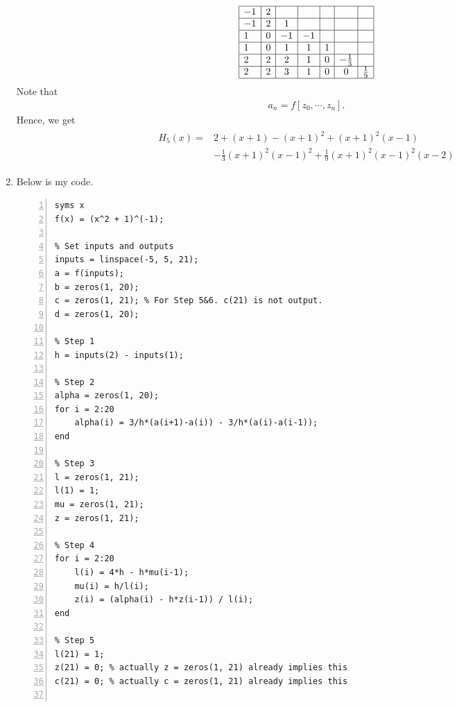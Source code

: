 \documentclass{article}
\begin{document}
\begin{enumerate}
\begin{align}
        \begin{array}{|l|c|c|c|c|c|c|}
            \hline
            -1 & 2 &    &&&&
            \\
            \hline
            -1 & 2 & 1  &&&&
            \\
            \hline
            1 & 0 & -1  & -1    &&&
            \\
            \hline
            1 & 0 & 1   & 1     & 1 &&
            \\
            \hline
            2 & 2 & 2   & 1     & 0 & -\frac{1}{3}  &
            \\
            \hline
            2 & 2 & 3   & 1     & 0 & 0             & \frac{1}{9}
            \\
            \hline
        \end{array}
    \end{align}
    Note that
    \begin{align*}
         a_n = f[z_0, \cdots, z_n].
    \end{align*}
    Hence, we get
    \begin{align}
        \begin{split}
            H_5(x) = & 2 + (x+1) - (x+1)^2 + (x+1)^2(x-1)
            \\ & - \frac{1}{3}(x+1)^2(x-1)^2 + \frac{1}{9}(x+1)^2(x-1)^2(x-2)
        \end{split}
    \end{align}
    \item Below is my code. \begin{lstlisting}[frame=single, numbers=left, style=Matlab-editor]
% Set our function
syms x
f(x) = (x^2 + 1)^(-1);

% Set inputs and outputs
inputs = linspace(-5, 5, 21);
a = f(inputs);
b = zeros(1, 20);
c = zeros(1, 21); % For Step 5&6. c(21) is not output.
d = zeros(1, 20);

% Step 1
h = inputs(2) - inputs(1);

% Step 2
alpha = zeros(1, 20);
for i = 2:20
    alpha(i) = 3/h*(a(i+1)-a(i)) - 3/h*(a(i)-a(i-1));
end

% Step 3
l = zeros(1, 21);
l(1) = 1;
mu = zeros(1, 21);
z = zeros(1, 21);

% Step 4
for i = 2:20
    l(i) = 4*h - h*mu(i-1);
    mu(i) = h/l(i);
    z(i) = (alpha(i) - h*z(i-1)) / l(i);
end

% Step 5
l(21) = 1;
z(21) = 0; % actually z = zeros(1, 21) already implies this
c(21) = 0; % actually c = zeros(1, 21) already implies this


\end{lstlisting}
\end{enumerate}
\end{document}
